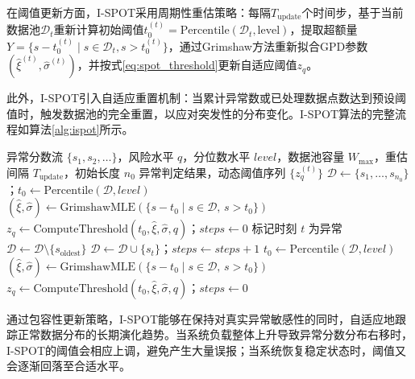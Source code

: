 在阈值更新方面，I-SPOT采用周期性重估策略：每隔$T_{\text{update}}$个时间步，基于当前数据池$\mathcal{D}_t$重新计算初始阈值$t_0^{(t)} = \text{Percentile}(\mathcal{D}_t, \text{level})$，提取超额量$Y = \{s - t_0^{(t)} \mid s \in \mathcal{D}_t, s > t_0^{(t)}\}$，通过Grimshaw方法重新拟合GPD参数$(\hat{\xi}^{(t)}, \hat{\sigma}^{(t)})$，并按式\eqref{eq:spot_threshold}更新自适应阈值$z_q$。

此外，I-SPOT引入自适应重置机制：当累计异常数或已处理数据点数达到预设阈值时，触发数据池的完全重置，以应对突发性的分布变化。I-SPOT算法的完整流程如算法\ref{alg:ispot}所示。

\begin{algorithm}[H]
    \label{alg:ispot}
    \begin{algorithmic}[1]
        \Require 异常分数流 $\{s_1, s_2, \ldots\}$，风险水平 $q$，分位数水平 $\textit{level}$，数据池容量 $W_{\max}$，重估间隔 $T_{\text{update}}$，初始长度 $n_0$
        \Ensure 异常判定结果，动态阈值序列 $\{z_q^{(t)}\}$
        \State $\mathcal{D} \gets \{s_1, \ldots, s_{n_0}\}$；$t_0 \gets \text{Percentile}(\mathcal{D}, \textit{level})$ 
        \State $(\hat{\xi}, \hat{\sigma}) \gets \text{GrimshawMLE}(\{s - t_0 \mid s \in \mathcal{D},\, s > t_0\})$ 
        \State $z_q \gets \text{ComputeThreshold}(t_0, \hat{\xi}, \hat{\sigma}, q)$；$\textit{steps} \gets 0$
             标记时刻 $t$ 为异常 \EndIf
             $\mathcal{D} \gets \mathcal{D} \setminus \{s_{\text{oldest}}\}$ \EndIf {}
            \State $\mathcal{D} \gets \mathcal{D} \cup \{s_t\}$；$\textit{steps} \gets \textit{steps} + 1$ 
             
                \State $t_0 \gets \text{Percentile}(\mathcal{D}, \textit{level})$
                \State $(\hat{\xi}, \hat{\sigma}) \gets \text{GrimshawMLE}(\{s - t_0 \mid s \in \mathcal{D},\, s > t_0\})$
                \State $z_q \gets \text{ComputeThreshold}(t_0, \hat{\xi}, \hat{\sigma}, q)$；$\textit{steps} \gets 0$
            \EndIf
        \EndFor
    \end{algorithmic}
\end{algorithm}

通过包容性更新策略，I-SPOT能够在保持对真实异常敏感性的同时，自适应地跟踪正常数据分布的长期演化趋势。当系统负载整体上升导致异常分数分布右移时，I-SPOT的阈值会相应上调，避免产生大量误报；当系统恢复稳定状态时，阈值又会逐渐回落至合适水平。

